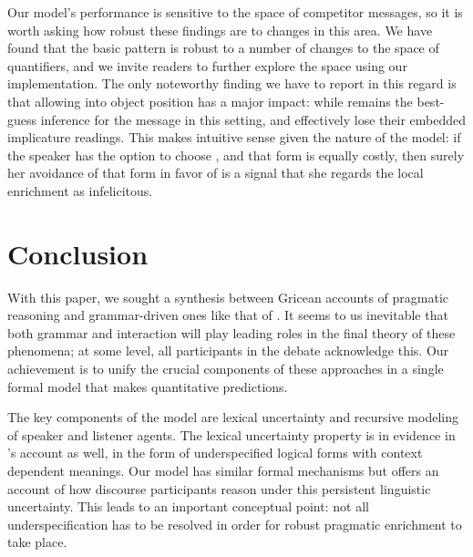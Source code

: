 \documentclass[leqno]{article}
\begin{document}
Our model's performance is sensitive to the space of competitor
messages, so it is worth asking how robust these findings are to
changes in this area. We have found that the basic pattern is robust
to a number of changes to the space of quantifiers, and we invite
readers to further explore the space using our implementation.  The
only noteworthy finding we have to report in this regard is that
allowing  into object position has a major impact:
while  remains the best-guess inference for the message
 in this setting,  and
 effectively lose their embedded implicature
readings.  This makes intuitive sense given the nature of the model:
if the speaker has the option to choose , and that form is equally costly, then surely her avoidance
of that form in favor of  is a signal that she
regards the local enrichment as infelicitous.


\section{Conclusion}\label{sec:conclusion}


With this paper, we sought a synthesis between Gricean accounts of
pragmatic reasoning and grammar-driven ones like that of
\citet{ChierchiaFoxSpector08}. It seems to us inevitable that both
grammar and interaction will play leading roles in the final theory of
these phenomena; at some level, all participants in the debate
acknowledge this. Our achievement is to unify the crucial components
of these approaches in a single formal model that makes quantitative
predictions.

The key components of the model are lexical uncertainty and recursive
modeling of speaker and listener agents. The lexical uncertainty
property is in evidence in \citeauthor{ChierchiaFoxSpector08}'s
account as well, in the form of underspecified logical forms with
context dependent meanings. Our model has similar formal mechanisms
but offers an account of how discourse participants reason under this
persistent linguistic uncertainty. This leads to an important
conceptual point: not all underspecification has to be resolved in
order for robust pragmatic enrichment to take place.
\end{document}
